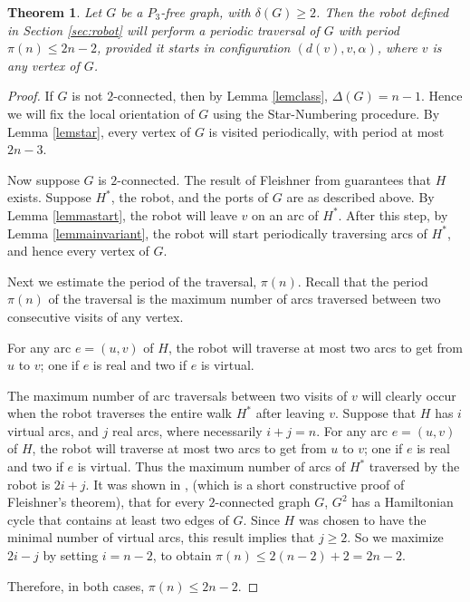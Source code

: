 \documentclass[12pt,letterpaper,oneside]{book}
\newtheorem{theorem}{Theorem}[section]
\begin{document}
\begin{theorem}\label{pmain}
Let $G$ be a $P_3$-free graph, with $\delta(G)\ge 2$.  Then the 
robot defined in Section \ref{sec:robot} 
will perform a periodic traversal of $G$ with period $\pi (n) \le 2n-2$, provided it starts in configuration $(d(v),v,\alpha)$, 
where $v$ is any vertex of $G$.
\end{theorem} 
\begin{proof} 
 
If $G$ is not $2$-connected, then by Lemma \ref{lemclass}, $\Delta(G)=n-1$.  Hence we will fix the local orientation of $G$ using 
the Star-Numbering procedure.  By Lemma \ref{lemstar}, every vertex of $G$ is visited periodically, with period at most $2n-3$.  


Now suppose $G$ is $2$-connected.  
The result of Fleishner from \cite{FL} guarantees that $H$ exists.  Suppose $H^*$, the robot, and the ports of $G$ 
are as described above.  
By Lemma \ref{lemmastart}, the robot will leave $v$ on an arc of $H^*$.  After this step, by 
Lemma \ref{lemmainvariant}, the robot will start periodically traversing arcs of $H^*$, and hence every vertex of $G$.  

Next we estimate 
the period of the traversal, $\pi(n)$.  
Recall that the period $\pi(n)$ of the traversal 
is the maximum number of arcs traversed between two consecutive visits of any vertex.  


For any arc $e=(u,v)$ of $H$, the robot will traverse at most two arcs to get from $u$ to $v$; one if $e$ 
is real and two if $e$ is virtual.  

The maximum number of arc traversals between two visits of $v$ will clearly occur 
when the robot traverses the entire walk $H^*$ after leaving $v$.  Suppose that $H$ has $i$ virtual arcs, and $j$ real arcs, 
where necessarily $i+j=n$.  For any arc $e=(u,v)$ of $H$, the robot will traverse at most two arcs to get from $u$ to $v$; one if $e$ 
is real and two if $e$ is virtual.  
Thus the maximum number of arcs of $H^*$ traversed by the robot is $2i+j$.  
It was shown in \cite{G}, (which is a short constructive proof of Fleishner's theorem), that for every $2$-connected 
graph $G$, $G^2$ has a Hamiltonian cycle that contains at least two edges of $G$.  Since $H$ 
was chosen to have the minimal number of virtual arcs, this result implies that $j\ge 2$.  So we maximize $2i-j$ by setting $i=n-2$, to obtain 
$\pi(n)\le 2(n-2)+2 = 2n-2$.  

Therefore, in both cases, $\pi(n)\le 2n-2$.  
 
\end{proof} 
\end{document}
